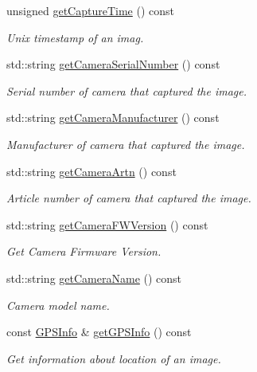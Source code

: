 \begin{DoxyCompactItemize}
unsigned \hyperlink{classwtl_1_1_source_meta_data_ac0a710c790df3e6c20a2e5e0d09a72be}{get\+Capture\+Time} () const
\begin{DoxyCompactList}\small\item\em Unix timestamp of an imag. \end{DoxyCompactList}\item 
std\+::string \hyperlink{classwtl_1_1_source_meta_data_a2f5e624ff2afb463c7833857674e6c72}{get\+Camera\+Serial\+Number} () const
\begin{DoxyCompactList}\small\item\em Serial number of camera that captured the image. \end{DoxyCompactList}\item 
std\+::string \hyperlink{classwtl_1_1_source_meta_data_aba6ebedd1aea262d0bd153ed269798c2}{get\+Camera\+Manufacturer} () const
\begin{DoxyCompactList}\small\item\em Manufacturer of camera that captured the image. \end{DoxyCompactList}\item 
std\+::string \hyperlink{classwtl_1_1_source_meta_data_a5f6e561825f34c91e81fbfa3bc036b7d}{get\+Camera\+Artn} () const
\begin{DoxyCompactList}\small\item\em Article number of camera that captured the image. \end{DoxyCompactList}\item 
std\+::string \hyperlink{classwtl_1_1_source_meta_data_a897edcd3c9426dc80d42905636c3d87d}{get\+Camera\+F\+W\+Version} () const
\begin{DoxyCompactList}\small\item\em Get Camera Firmware Version. \end{DoxyCompactList}\item 
std\+::string \hyperlink{classwtl_1_1_source_meta_data_a0743539c60ee8f8e3ece43e9404a05a4}{get\+Camera\+Name} () const
\begin{DoxyCompactList}\small\item\em Camera model name. \end{DoxyCompactList}\item 
const \hyperlink{classwtl_1_1_g_p_s_info}{G\+P\+S\+Info} \& \hyperlink{classwtl_1_1_source_meta_data_a52c2ee24703bedb5655f50652ed0b5e3}{get\+G\+P\+S\+Info} () const
\begin{DoxyCompactList}\small\item\em Get information about location of an image. \end{DoxyCompactList}\item 

\end{DoxyCompactItemize}
